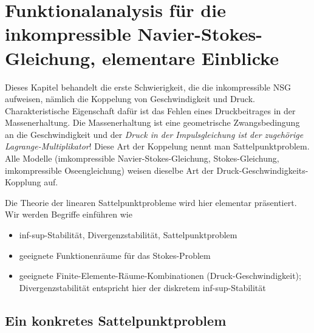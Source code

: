 \section{Funktionalanalysis für die inkompressible Navier-Stokes-Gleichung, elementare Einblicke}
\label{sec:funkt-fur-die}

\begin{bemerkung}
  Dieses Kapitel behandelt die erste Schwierigkeit, die die inkompressible NSG aufweisen, nämlich die Koppelung von Geschwindigkeit und Druck. Charakteristische Eigenschaft dafür ist das Fehlen eines Druckbeitrages in der Massenerhaltung. Die Massenerhaltung ist eine geometrische Zwangsbedingung an die Geschwindigkeit und der \emph{Druck in der Impulsgleichung ist der zugehörige Lagrange-Multiplikator}!  Diese Art der Koppelung nennt man Sattelpunktproblem. Alle Modelle (imkompressible Navier-Stokes-Gleichung, Stokes-Gleichung, imkompressible Oseengleichung) weisen dieselbe Art der Druck-Geschwindigkeits-Kopplung auf.

Die Theorie der linearen Sattelpunktprobleme wird hier elementar präsentiert. Wir werden Begriffe einführen wie
\begin{itemize}
\item inf-sup-Stabilität, Divergenzstabilität, Sattelpunktproblem
\item geeignete Funktionenräume für das Stokes-Problem
\item geeignete Finite-Elemente-Räume-Kombinationen (Druck-Geschwindigkeit); Divergenzstabilität entspricht hier der diskretem inf-sup-Stabilität
\end{itemize}
\end{bemerkung}
\subsection{Ein konkretes Sattelpunktproblem}
\label{sec:ein-konkr-satt}

